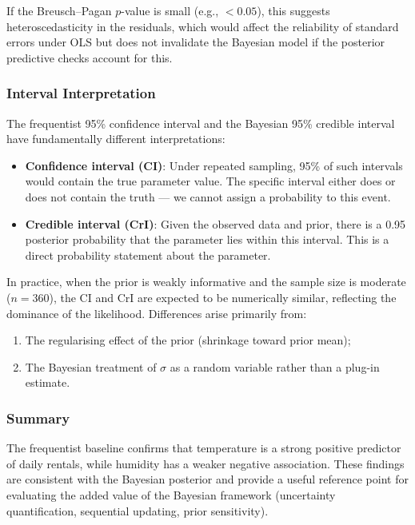 If the Breusch--Pagan $p$-value is small (e.g., $< 0.05$), this suggests heteroscedasticity in the residuals, which would affect the reliability of standard errors under OLS but does not invalidate the Bayesian model if the posterior predictive checks account for this.

\subsubsection{Interval Interpretation}

The frequentist 95\% confidence interval and the Bayesian 95\% credible interval have fundamentally different interpretations:

\begin{itemize}
    \item \textbf{Confidence interval (CI)}: Under repeated sampling, 95\% of such intervals would contain the true parameter value. The specific interval either does or does not contain the truth --- we cannot assign a probability to this event.
    \item \textbf{Credible interval (CrI)}: Given the observed data and prior, there is a 0.95 posterior probability that the parameter lies within this interval. This is a direct probability statement about the parameter.
\end{itemize}

In practice, when the prior is weakly informative and the sample size is moderate ($n = 360$), the CI and CrI are expected to be numerically similar, reflecting the dominance of the likelihood. Differences arise primarily from:
\begin{enumerate}
    \item The regularising effect of the prior (shrinkage toward prior mean);
    \item The Bayesian treatment of $\sigma$ as a random variable rather than a plug-in estimate.
\end{enumerate}

\subsubsection{Summary}

The frequentist baseline confirms that temperature is a strong positive predictor of daily rentals, while humidity has a weaker negative association. These findings are consistent with the Bayesian posterior and provide a useful reference point for evaluating the added value of the Bayesian framework (uncertainty quantification, sequential updating, prior sensitivity).
